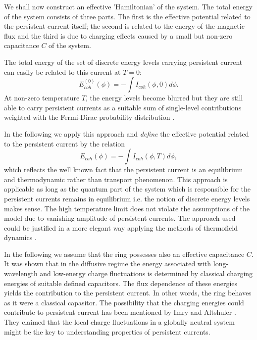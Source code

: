 \documentclass[a4paper,final]{appolb}
\begin{document}
We shall now construct an effective 'Hamiltonian' of the system.
The total energy of the system consists of three parts. The first is 
the effective potential related to the persistent current itself;
 the second is related to the energy of the  magnetic flux and the third 
is due to  charging effects caused by a small but non-zero 
capacitance $C$ of the system. 

The total energy of the set of discrete energy levels carrying persistent current can easily be related to this current at $T=0$:
\begin{equation}
E_{coh}^{(0)}(\phi)= - \int I_{coh}(\phi, 0) d\phi.
\end{equation}
At non-zero temperature $T$, the energy levels become blurred but they are still able to  carry persistent currents as a suitable sum of single-level contributions weighted with the Fermi-Dirac probability distribution \cite{cheng}.   

In the following we apply this approach and {\it define} 
 the effective  potential related to the persistent current   by the 
 relation
%
\begin{equation} \label{E2}
E_{coh}(\phi)= - \int I_{coh}(\phi, T) d\phi,
\end{equation}
%
which reflects the well known fact that the persistent current is an 
equilibrium and thermodynamic rather than transport phenomenon. This approach is applicable as long as the quantum part of the system which is responsible for the persistent currents remains in equilibrium i.e. the notion of discrete energy levels makes sense.  The high temperature limit does not violate the assumptions of the model due to vanishing amplitude of persistent currents.  
The approach used could be justified in a more elegant way applying the 
methods of thermofield dynamics \cite{termo}.

In the following we assume that the ring possesses also an effective 
capacitance $C$. 
It was shown \cite{kopietz} that in the diffusive regime the energy associated with long-wavelength 
and low-energy charge fluctuations is determined by classical charging energies of suitable defined 
capacitors. The flux dependence of these energies yields the contribution to the persistent current. 
In other words, the ring behaves as it were a classical capasitor. 
The possibility that the charging energies could contribute to persistent current has been mentioned
by Imry and Altshuler \cite{alt}. 
They claimed that the local charge fluctuations in a globally neutral system might be the key to 
understanding properties of persistent currents. 
\end{document}

